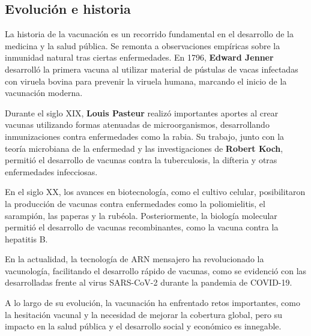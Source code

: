 \begin{enumerate}
 
\end{enumerate}

\subsection{Evolución e historia}
La historia de la vacunación es un recorrido fundamental en el desarrollo de la medicina y la salud pública. Se remonta a observaciones empíricas sobre la inmunidad natural tras ciertas enfermedades. En 1796, \textbf{Edward Jenner} desarrolló la primera vacuna al utilizar material de pústulas de vacas infectadas con viruela bovina para prevenir la viruela humana, marcando el inicio de la vacunación moderna.

Durante el siglo XIX, \textbf{Louis Pasteur} realizó importantes aportes al crear vacunas utilizando formas atenuadas de microorganismos, desarrollando inmunizaciones contra enfermedades como la rabia. Su trabajo, junto con la teoría microbiana de la enfermedad y las investigaciones de \textbf{Robert Koch}, permitió el desarrollo de vacunas contra la tuberculosis, la difteria y otras enfermedades infecciosas.

En el siglo XX, los avances en biotecnología, como el cultivo celular, posibilitaron la producción de vacunas contra enfermedades como la poliomielitis, el sarampión, las paperas y la rubéola. Posteriormente, la biología molecular permitió el desarrollo de vacunas recombinantes, como la vacuna contra la hepatitis B.

En la actualidad, la tecnología de ARN mensajero ha revolucionado la vacunología, facilitando el desarrollo rápido de vacunas, como se evidenció con las desarrolladas frente al virus SARS-CoV-2 durante la pandemia de COVID-19.

A lo largo de su evolución, la vacunación ha enfrentado retos importantes, como la hesitación vacunal y la necesidad de mejorar la cobertura global, pero su impacto en la salud pública y el desarrollo social y económico es innegable.


